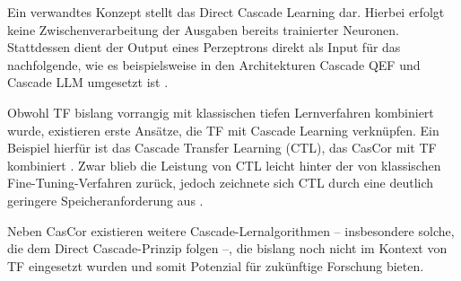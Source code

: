 Ein verwandtes Konzept stellt das Direct Cascade Learning dar. Hierbei erfolgt keine Zwischenverarbeitung der Ausgaben bereits trainierter 
Neuronen. Stattdessen dient der Output eines Perzeptrons direkt als Input für das nachfolgende, wie es beispielsweise in den Architekturen 
Cascade QEF und Cascade LLM umgesetzt ist \cite{cascade_network_architectures,cascade_llm_networks}.

Obwohl TF bislang vorrangig mit klassischen tiefen Lernverfahren kombiniert wurde, existieren erste Ansätze, die TF mit 
Cascade Learning verknüpfen. Ein Beispiel hierfür ist das Cascade Transfer Learning (CTL), das CasCor mit TF 
kombiniert \cite{phd_deep_cascade}. Zwar blieb die Leistung von CTL leicht hinter der von klassischen Fine-Tuning-Verfahren zurück, jedoch 
zeichnete sich CTL durch eine deutlich geringere Speicheranforderung aus \cite{phd_deep_cascade}.

Neben CasCor existieren weitere Cascade-Lernalgorithmen – insbesondere solche, die dem Direct Cascade-Prinzip folgen –, die bislang noch nicht 
im Kontext von TF eingesetzt wurden und somit Potenzial für zukünftige Forschung bieten.
